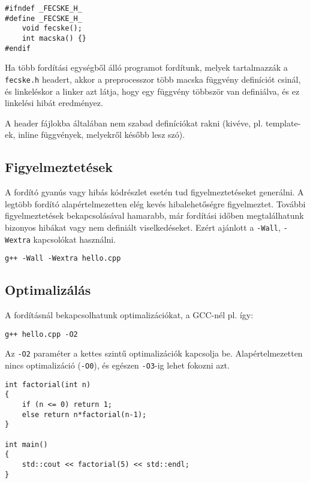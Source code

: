 \documentclass[../cpp_book/cpp_book.tex]{subfiles}
\begin{document}
	\begin{lstlisting}
#ifndef _FECSKE_H_
#define _FECSKE_H_
	void fecske();
	int macska() {}
#endif
	\end{lstlisting}
		
	Ha több fordítási egységből álló programot fordítunk, melyek tartalmazzák a \texttt{fecske.h} headert, akkor a preprocesszor több macska függvény definíciót csinál, és linkeléskor a linker azt látja, hogy egy függvény többször van definiálva, és ez linkelési hibát eredményez.
	\begin{note}
		A header fájlokba általában nem szabad definíciókat rakni (kivéve, pl. template-ek, inline függvények, melyekről később lesz szó).
	\end{note}
	
	\subsection{Figyelmeztetések}

  A fordító gyanús vagy hibás kódrészlet esetén tud figyelmeztetéseket generálni. A legtöbb fordító alapértelmezetten elég kevés hibalehetőségre figyelmeztet. További figyelmeztetések bekapcsolásával hamarabb, már fordítási időben megtalálhatunk bizonyos hibákat vagy nem definiált viselkedéseket. Ezért ajánlott a \texttt{-Wall}, \texttt{-Wextra} kapcsolókat használni.

	{\centering \texttt{g++ -Wall -Wextra hello.cpp} \par}

	\subsection{Optimalizálás}
	A fordításnál bekapcsolhatunk optimalizációkat, a GCC-nél pl. így:
	
	{\centering \texttt{g++ hello.cpp -O2} \par}
	
	Az \texttt{-O2} paraméter a kettes szintű optimalizációk kapcsolja be. Alapértelmezetten nincs optimalizáció (\texttt{-O0}), és egészen \texttt{-O3}-ig lehet fokozni azt.
	\bigskip
	
	\begin{lstlisting}
int factorial(int n)
{
	if (n <= 0) return 1;
	else return n*factorial(n-1);
}

int main()
{
	std::cout << factorial(5) << std::endl;
}
	\end{lstlisting}
	
\end{document}

